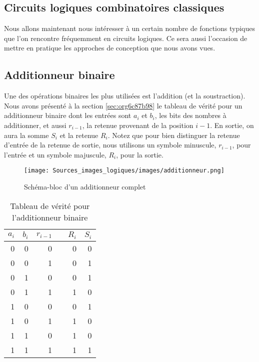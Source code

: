 \documentclass[11pt]{article}
\begin{document}
\subsection{Circuits logiques combinatoires classiques}
\label{sec:orgf81662d}

Nous allons maintenant nous intéresser à un certain nombre de
fonctions typiques que l'on rencontre fréquemment en circuits
logiques. Ce sera aussi l'occasion de mettre en pratique les approches
de conception que nous avons vues.


\subsection{Additionneur binaire}
\label{sec:org997b938}

Une des opérations binaires les plus utilisées est l'addition (et la
soustraction). Nous avons présenté à la section \ref{sec:org6c87b98} le tableau de vérité pour un additionneur binaire dont les
entrées sont \(a_{i}\) et \(b_{i}\), les bits des nombres à
additionner, et aussi \(r_{i-1}\), la retenue provenant de la position
\(i-1\). En sortie, on aura la somme \(S_{i}\) et la retenue
\(R_{i}\). Notez que pour bien distinguer la retenue d'entrée de la
retenue de sortie, nous utilisons un symbole minuscule, \(r_{i-1}\),
pour l'entrée et un symbole majuscule, \(R_{i}\), pour la sortie. 

\begin{figure}[htbp]
\centering
\texttt{[image: Sources\_images\_logiques/images/additionneur.png]}
\caption{\label{fig:org7e9748d}Schéma-bloc d'un additionneur complet}
\end{figure}

\begin{table}[htbp]
\caption{\label{tab:org60713fa}Tableau de vérité pour l'additionneur binaire}
\centering
\begin{tabular}{rrrlrr}
\(a_{i}\) & \(b_{i}\) & \(r_{i-1}\) &  & \(R_{i}\) & \(S_{i}\)\\
\hline
0 & 0 & 0 &  & 0 & 0\\
0 & 0 & 1 &  & 0 & 1\\
0 & 1 & 0 &  & 0 & 1\\
0 & 1 & 1 &  & 1 & 0\\
1 & 0 & 0 &  & 0 & 1\\
1 & 0 & 1 &  & 1 & 0\\
1 & 1 & 0 &  & 1 & 0\\
1 & 1 & 1 &  & 1 & 1\\
\end{tabular}
\end{table}
\end{document}
